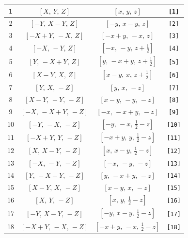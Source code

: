 \documentclass[fleqn,8pt]{jsarticle}
\begin{document}
\begin{longtable}{cccc}
1 & $\left[ X,\, Y,\, Z \right]$ & $\left[ x,\, y,\, z \right]$ & {\tt [1]} \\ \hline
2 & $\left[ - Y,\, X - Y,\, Z \right]$ & $\left[ - y,\, x - y,\, z \right]$ & {\tt [2]} \\ \hline
3 & $\left[ - X + Y,\, - X,\, Z \right]$ & $\left[ - x + y,\, - x,\, z \right]$ & {\tt [3]} \\ \hline
4 & $\left[ - X,\, - Y,\, Z \right]$ & $\left[ - x,\, - y,\, z + \frac{1}{2} \right]$ & {\tt [4]} \\ \hline
5 & $\left[ Y,\, - X + Y,\, Z \right]$ & $\left[ y,\, - x + y,\, z + \frac{1}{2} \right]$ & {\tt [5]} \\ \hline
6 & $\left[ X - Y,\, X,\, Z \right]$ & $\left[ x - y,\, x,\, z + \frac{1}{2} \right]$ & {\tt [6]} \\ \hline
7 & $\left[ Y,\, X,\, - Z \right]$ & $\left[ y,\, x,\, - z \right]$ & {\tt [7]} \\ \hline
8 & $\left[ X - Y,\, - Y,\, - Z \right]$ & $\left[ x - y,\, - y,\, - z \right]$ & {\tt [8]} \\ \hline
9 & $\left[ - X,\, - X + Y,\, - Z \right]$ & $\left[ - x,\, - x + y,\, - z \right]$ & {\tt [9]} \\ \hline
10 & $\left[ - Y,\, - X,\, - Z \right]$ & $\left[ - y,\, - x,\, \frac{1}{2} - z \right]$ & {\tt [10]} \\ \hline
11 & $\left[ - X + Y,\, Y,\, - Z \right]$ & $\left[ - x + y,\, y,\, \frac{1}{2} - z \right]$ & {\tt [11]} \\ \hline
12 & $\left[ X,\, X - Y,\, - Z \right]$ & $\left[ x,\, x - y,\, \frac{1}{2} - z \right]$ & {\tt [12]} \\ \hline
13 & $\left[ - X,\, - Y,\, - Z \right]$ & $\left[ - x,\, - y,\, - z \right]$ & {\tt [13]} \\ \hline
14 & $\left[ Y,\, - X + Y,\, - Z \right]$ & $\left[ y,\, - x + y,\, - z \right]$ & {\tt [14]} \\ \hline
15 & $\left[ X - Y,\, X,\, - Z \right]$ & $\left[ x - y,\, x,\, - z \right]$ & {\tt [15]} \\ \hline
16 & $\left[ X,\, Y,\, - Z \right]$ & $\left[ x,\, y,\, \frac{1}{2} - z \right]$ & {\tt [16]} \\ \hline
17 & $\left[ - Y,\, X - Y,\, - Z \right]$ & $\left[ - y,\, x - y,\, \frac{1}{2} - z \right]$ & {\tt [17]} \\ \hline
18 & $\left[ - X + Y,\, - X,\, - Z \right]$ & $\left[ - x + y,\, - x,\, \frac{1}{2} - z \right]$ & {\tt [18]} \\ \hline

\end{longtable}
\end{document}
